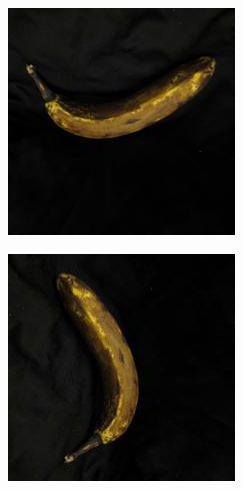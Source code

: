 \documentclass{article} %
\begin{document}
\begin{figure}[h]
\begin{subfigure}{.123\textwidth}
\end{subfigure}%
  \begin{subfigure}{.123\textwidth}
  \centering
\includegraphics[width=\textwidth]{0_3.jpg}
\end{subfigure}%
  \begin{subfigure}{.123\textwidth}
  \centering
\includegraphics[width=\textwidth]{0_4.jpg}

\end{subfigure}
\end{figure}
\end{document}

